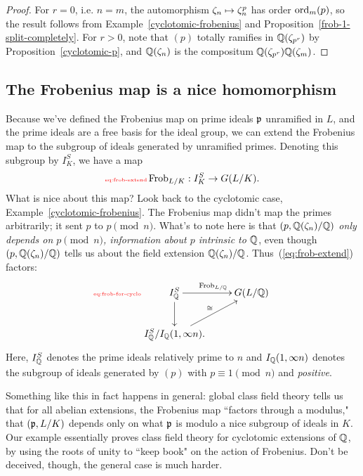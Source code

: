 \begin{proof}
For $r=0$, i.e. $n=m$, the automorphism $\zeta_n\mapsto \zeta_n^p$ has order $\operatorname{ord}_m(p)$, so the result follows from Example~\ref{cyclotomic-frobenius} and Proposition~\ref{frob-1-split-completely}. For $r>0$, note that $(p)$ totally ramifies in $\mathbb{Q}(\zeta_{p^r})$ by Proposition~\ref{cyclotomic-p}, and $\mathbb{Q}(\zeta_{n})$ is the compositum $\mathbb{Q}(\zeta_{p^r})\mathbb{Q}(\zeta_m)$.
\end{proof}

\subsection{The Frobenius map is a nice homomorphism}
Because we've defined the Frobenius map on prime ideals $\mathfrak{p}$ unramified in $L$, and the prime ideals are a free basis for the ideal group, we can extend the Frobenius map to the subgroup of ideals generated by unramified primes. Denoting this subgroup by $I_K^S$, we have a map
\begin{equation}\llabel{eq:frob-extend}
\Frob_{L/K}:I_K^S\to G(L/K).
\end{equation}
What is nice about this map? Look back to the cyclotomic case, Example~\ref{cyclotomic-frobenius}. The Frobenius map didn't map the primes arbitrarily; it sent $p$ to $p\pmod n$. What's to note here is that {\it $(p,\mathbb{Q}(\zeta_n)/\mathbb{Q})$ only depends on $p\pmod n$, information about $p$ intrinsic to $\mathbb{Q}$}, even though $(p,\mathbb{Q}(\zeta_n)/\mathbb{Q})$ tells us about the field extension $\mathbb{Q}(\zeta_n)/\mathbb{Q}$. Thus~(\ref{eq:frob-extend}) factors:
\begin{equation}\llabel{eq:frob-for-cyclo}
\xymatrix{
I_{\Q}^S\ar[r]^{\Frob_{L/\Q}} \ar[d] & G(L/\Q)\\
I_{\Q}^S/I_{\Q}(1, \iy n).\ar[ur]^{\cong}}
\end{equation}
Here, $I_{\mathbb{Q}}^S$ denotes the prime ideals relatively prime to $n$ and $I_{\mathbb{Q}}(1, \infty n)$ denotes the subgroup of ideals generated by $(p)$ with $p\equiv 1\pmod n$ and {\it positive}.

Something like this in fact happens in general: global class field theory tells us that for all abelian extensions, the Frobenius map ``factors through a modulus," that $(\mathfrak{p},L/K)$ depends only on what $\mathfrak{p}$ is modulo a nice subgroup of ideals in $K$. Our example essentially proves class field theory for cyclotomic extensions of $\mathbb{Q}$, by using the roots of unity to ``keep book" on the action of Frobenius. Don't be deceived, though, the general case is much harder.

